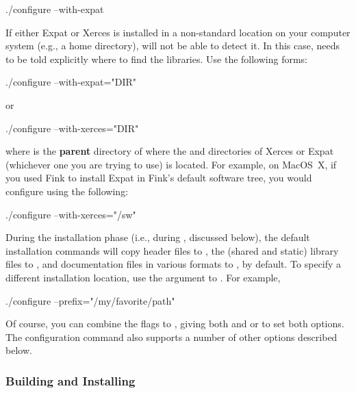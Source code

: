 \documentclass{sbmlmanual}
\begin{document}
\begin{shellVerbatim}
  ./configure --with-expat
\end{shellVerbatim}

If either Expat or Xerces is installed in a non-standard location on your
computer system (e.g., a home directory),  will not be
able to detect it.  In this case,  needs to be told
explicitly where to find the libraries.  Use the following forms:

\begin{shellVerbatim}
  ./configure --with-expat="DIR"
\end{shellVerbatim}
or
\begin{shellVerbatim}
  ./configure --with-xerces="DIR"
\end{shellVerbatim}

where  is the \textbf{parent} directory of where the
 and  directories of Xerces or Expat (whichever one
you are trying to use) is located.  For example, on MacOS~X, if you used
Fink to install Expat in Fink's default software tree, you would configure
\libsbml{} using the following:

\begin{shellVerbatim}
  ./configure --with-xerces="/sw"
\end{shellVerbatim}

During the installation phase (i.e., during , discussed
below), the default \libsbml{} installation commands will copy header files
to , the (shared and static) library files
to , and documentation files in various formats to
, by default.  To
specify a different installation location, use the 
argument to .  For example,

\begin{shellVerbatim}
  ./configure --prefix="/my/favorite/path"
\end{shellVerbatim}

Of course, you can combine the flags to , giving both
 and  or  to set
both options.  The \libsbml{} configuration command also supports a number
of other options described below.


\subsubsection{Building and Installing \libsbml{}}
\end{document}
